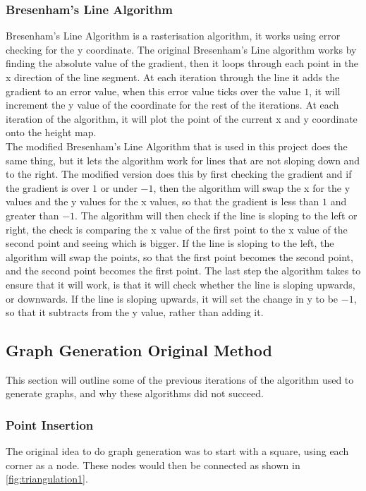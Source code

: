 \subsubsection{Bresenham's Line Algorithm}
	\par
	Bresenham's Line Algorithm is a rasterisation algorithm, it works using error checking for the y coordinate. The original Bresenham's Line algorithm works by finding the absolute value of the gradient, then it loops through each point in the x direction of the line segment. At each iteration through the line it adds the gradient to an error value, when this error value ticks over the value $1$, it will increment the y value of the coordinate for the rest of the iterations. At each iteration of the algorithm, it will plot the point of the current x and y coordinate onto the height map.\\
	The modified Bresenham's Line Algorithm that is used in this project does the same thing, but it lets the algorithm work for lines that are not sloping down and to the right. The modified version does this by first checking the gradient and if the gradient is over $1$ or under $-1$, then the algorithm will swap the x for the y values and the y values for the x values, so that the gradient is less than $1$ and greater than $-1$. The algorithm will then check if the line is sloping to the left or right, the check is comparing the x value of the first point to the x value of the second point and seeing which is bigger. If the line is sloping to the left, the algorithm will swap the points, so that the first point becomes the second point, and the second point becomes the first point. The last step the algorithm takes to ensure that it will work, is that it will check whether the line is sloping upwards, or downwards. If the line is sloping upwards, it will set the change in y to be $-1$, so that it subtracts from the y value, rather than adding it.


\subsection{Graph Generation Original Method}\label{subsec:GGOM}
This section will outline some of the previous iterations of the algorithm used to generate graphs, and why these algorithms did not succeed.
\subsubsection{Point Insertion}
\par
	The original idea to do graph generation was to start with a square, using each corner as a node. These nodes would then be connected as shown in \ref{fig:triangulation1}.\\

